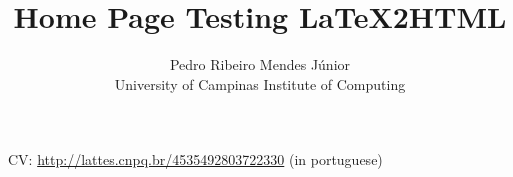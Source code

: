 \documentclass{article}
\title{Home Page Testing LaTeX2HTML}
\author{Pedro Ribeiro Mendes J\'{u}nior\\
  University of Campinas \textemdash{} Institute of Computing}
\begin{document}
\maketitle

CV: \url{http://lattes.cnpq.br/4535492803722330} (in portuguese)
\end{document}
